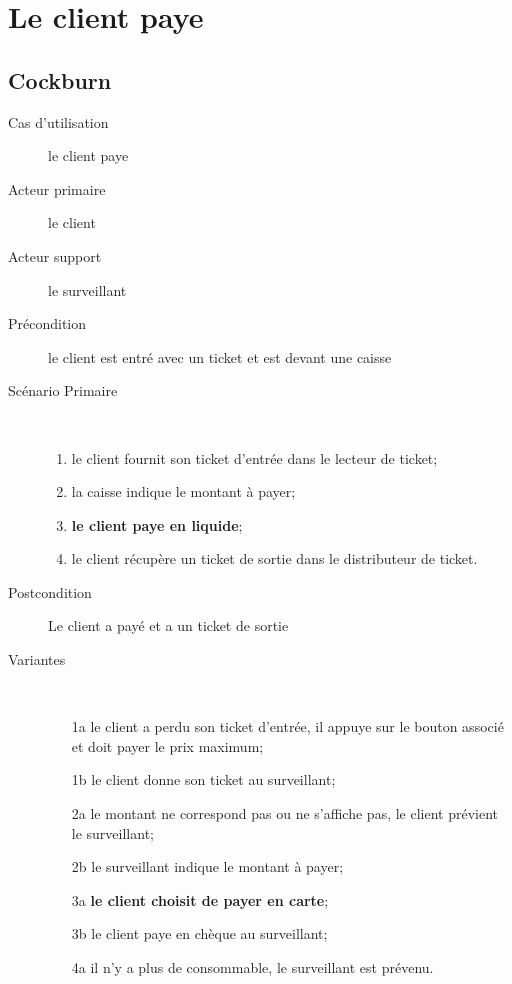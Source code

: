 \documentclass[a4paper]{article}
\begin{document}
\newpage


\section{Le client paye}
\subsection{Cockburn}
\begin{description}
	\item[Cas d'utilisation] le client paye
	\item[Acteur primaire] le client
	\item[Acteur support] le surveillant
	\item[Pr\'econdition] le client est entr\'e avec un ticket et est devant une caisse
	\item[Sc\'enario Primaire] \
	\begin{enumerate}
		\item le client fournit son ticket d'entr\'ee dans le lecteur de ticket;
		\item la caisse indique le montant \`a payer;
		\item \textbf{le client paye en liquide};
		\item le client r\'ecup\`ere un ticket de sortie dans le distributeur de ticket.
	\end{enumerate}
	\item[Postcondition] Le client a pay\'e et a un ticket de sortie
	\item[Variantes] \
	\begin{enumerate}
		\item[1a] le client a perdu son ticket d'entr\'ee, il appuye sur le
			bouton associ\'e et doit payer le prix maximum;
		\item[1b] le client donne son ticket au surveillant;
		\item[2a] le montant ne correspond pas ou ne s'affiche pas, le client
			pr\'evient le surveillant;
		\item[2b] le surveillant indique le montant \`a payer;
		\item[3a] \textbf{le client choisit de payer en carte};
		\item[3b] le client paye en ch\`eque au surveillant;
		\item[4a] il n'y a plus de consommable, le surveillant est pr\'evenu.
	\end{enumerate}
\end{description}
\end{document}
